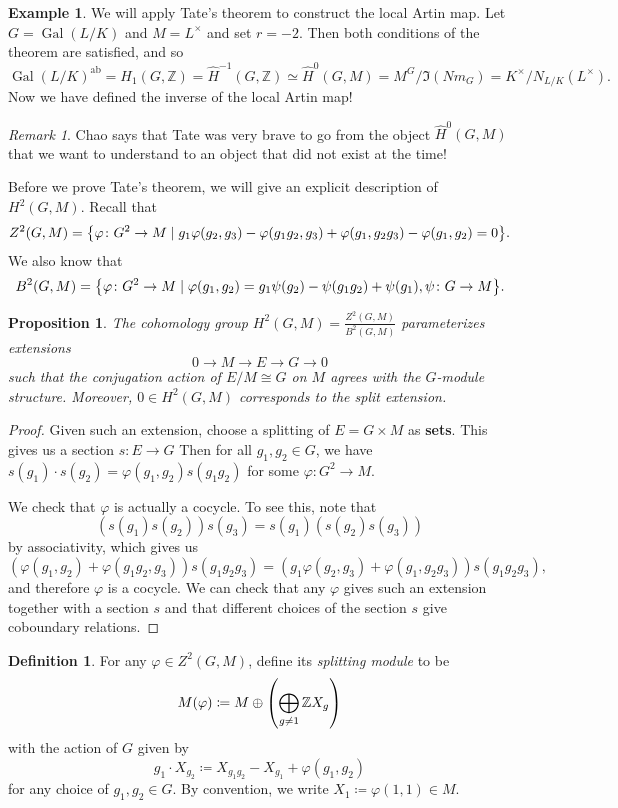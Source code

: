 \documentclass[leqno, openany]{memoir}
\newtheorem{prop}[thm]{Proposition}
\theoremstyle{definition}
\newtheorem{defn}[thm]{Definition}
\newtheorem{exm}[thm]{Example}
\theoremstyle{remark}
\newtheorem{rmk}[thm]{Remark}
\theoremstyle{plain}
\theoremstyle{definition}
\theoremstyle{remark}
\newcommand{\Z}{\mathbb{Z}}
\newcommand{\mr}[1]{\mathrm{#1}}
\newcommand{\wh}[1]{\widehat{#1}}
\DeclareMathOperator{\Gal}{Gal}
\begin{document}
\begin{exm}
    We will apply Tate's theorem to construct the local Artin map. Let $G = \Gal(L/K)$ and $M = L^{\times}$ and set $r = -2$. Then both conditions of the theorem are satisfied, and so 
    \[ {\Gal(L/K)}^{\mr{ab}} = H_1(G, \Z) = \wh{H}^{-1}(G, \Z) \simeq \wh{H}^0(G, M) = M^G / \Im (Nm_G) = K^{\times} / N_{L/K}(L^{\times}). \]
    Now we have defined the inverse of the local Artin map!
\end{exm}

\begin{rmk}
    Chao says that Tate was very brave to go from the object $\wh{H}^0(G, M)$ that we want to understand to an object that did not exist at the time!
\end{rmk}

Before we prove Tate's theorem, we will give an explicit description of $H^2(G, M)$. Recall that
\[ Z^2(G, M) = \qty{\varphi \colon G^2 \to M \mid g_1 \varphi(g_2, g_3) - \varphi(g_1g_2, g_3) + \varphi(g_1, g_2g_3) - \varphi(g_1, g_2) = 0}. \]
We also know that
\[ B^2(G, M) = \qty{\varphi \colon G^2 \to M \mid \varphi(g_1, g_2) = g_1 \psi(g_2) - \psi(g_1g_2) + \psi(g_1), \psi \colon G \to M}. \]
\begin{prop}
    The cohomology group $H^2(G, M) = \frac{Z^2(G, M)}{B^2(G, M)}$ parameterizes extensions 
    \[ 0 \to M \to E \to G \to 0 \]
    such that the conjugation action of $E/M \cong G$ on $M$ agrees with the $G$-module structure. Moreover, $0 \in H^2(G, M)$ corresponds to the split extension.
\end{prop}

\begin{proof}
    Given such an extension, choose a splitting of $E = G \times M$ as \textbf{sets}. This gives us a section $s \colon E \to G$ Then for all $g_1, g_2 \in G$, we have $s(g_1) \cdot s(g_2) = \varphi(g_1,g_2) s(g_1g_2)$ for some $\varphi \colon G^2 \to M$.

    We check that $\varphi$ is actually a cocycle. To see this, note that
    \[ (s(g_1) s(g_2))s(g_3) = s(g_1) (s(g_2) s(g_3)) \]
    by associativity, which gives us
    \[ ( \varphi(g_1,g_2) + \varphi(g_1g_2, g_3) ) s(g_1g_2g_3) = (g_1 \varphi(g_2,g_3) + \varphi(g_1,g_2g_3)) s(g_1g_2g_3), \]
    and therefore $\varphi$ is a cocycle. We can check that any $\varphi$ gives such an extension together with a section $s$ and that different choices of the section $s$ give coboundary relations.
\end{proof}

\begin{defn}
    For any $\varphi \in Z^2(G, M)$, define its \textit{splitting module} to be
    \[ M(\varphi) \coloneqq M \oplus \qty(\bigoplus_{g \neq 1} \Z X_g) \]
    with the action of $G$ given by
    \[ g_1 \cdot X_{g_2} \coloneqq X_{g_1g_2} - X_{g_1} + \varphi(g_1,g_2) \]
    for any choice of $g_1, g_2 \in G$. By convention, we write $X_1 \coloneqq \varphi(1,1) \in M$.
\end{defn}
\end{document}
